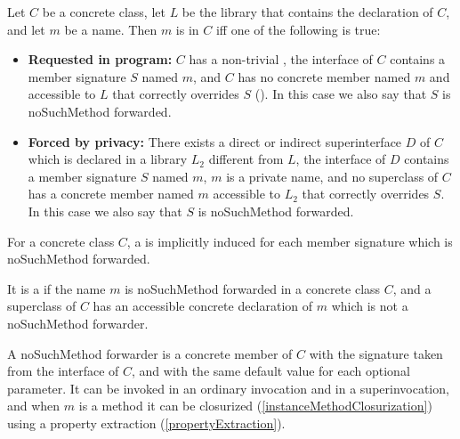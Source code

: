 \documentclass[makeidx]{article}
\begin{document}
\LMHash{}%
%
Let $C$ be a concrete class,
let $L$ be the library that contains the declaration of $C$,
and let $m$ be a name.
Then $m$ is  in $C$ if{}f
one of the following is true:

\begin{itemize}
\item \textbf{Requested in program:}
  $C$ has a non-trivial ,
  the interface of $C$ contains a member signature $S$ named $m$,
  and $C$ has no concrete member named $m$ and accessible to $L$
  that correctly overrides $S$
  ().
  In this case we also say that $S$ is noSuchMethod forwarded.
\item
  \textbf{Forced by privacy:}
  There exists a direct or indirect superinterface
  $D$ of $C$ which is declared in a library $L_2$ different from $L$,
  the interface of $D$ contains a member signature $S$ named $m$,
  $m$ is a private name,
  and no superclass of $C$ has
  a concrete member named $m$ accessible to $L_2$
  that correctly overrides $S$.
  In this case we also say that $S$ is noSuchMethod forwarded.
\end{itemize}

\LMHash{}%
For a concrete class $C$, a
is implicitly induced for each member signature
which is noSuchMethod forwarded.

\LMHash{}%
It is a  if the name $m$ is noSuchMethod forwarded
in a concrete class $C$,
and a superclass of $C$ has an accessible concrete declaration of $m$
which is not a noSuchMethod forwarder.

\LMHash{}%
A noSuchMethod forwarder is a concrete member of $C$
with the signature taken from the interface of $C$,
and with the same default value for each optional parameter.
It can be invoked in an ordinary invocation and in a superinvocation,
and when $m$ is a method it can be closurized
(\ref{instanceMethodClosurization})
using a property extraction
(\ref{propertyExtraction}).

\end{document}
